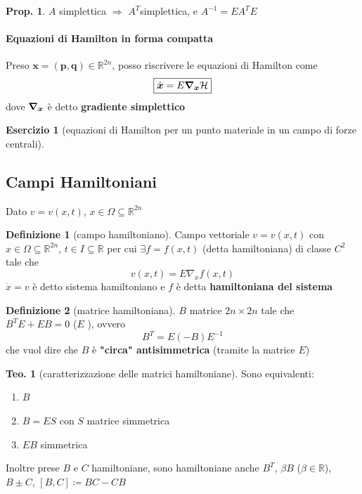 \documentclass[a4paper,10pt]{article}
\providecommand{\exercisename}{Esercizio}
\theoremstyle{definition}
\newtheorem*{xca*}{\protect\exercisename}
\newcommand{\bv}{\boldsymbol} %
\theoremstyle{indentdefinition}
\newtheorem{defn}{Definizione}[section]
\theoremstyle{indenttheorem}
\newtheorem{thm}{Teo.}
\newtheorem{prop}{Prop.}
\theoremstyle{myremark}
\theoremstyle{indentgeneral}
\begin{document}
\begin{prop}
$A$ simplettica $\Longrightarrow$ $A^{T}$simplettica, e $A^{-1}=EA^{T}E$
\end{prop}



\paragraph{Equazioni di Hamilton in forma compatta}
Preso $\bv{x}=\left(\bv{p},\bv{q}\right)\in\mathbb{R}^{2n}$,
posso riscrivere le equazioni di Hamilton come 
\[
\boxed{\dot{\bv{x}}=E\grad_{\bv{x}}\mathcal{H}}
\]
dove $\grad_{\bv{x}}$ è detto \textbf{gradiente simplettico}
\begin{xca*}[equazioni di Hamilton per un punto materiale in un campo di forze
centrali]

\end{xca*}

\subsection{Campi Hamiltoniani}

Dato $v=v\left(x,t\right)$, $x\in\Omega\subseteq\mathbb{R}^{2n}$ 
\begin{defn}[campo hamiltoniano]
\label{def:campo-hamiltoniano}Campo vettoriale $v=v\left(x,t\right)$
con $x\in\Omega\subseteq\mathbb{R}^{2n}$, $t\in I\subseteq\mathbb{R}$
per cui $\exists f=f\left(x,t\right)$ (detta hamiltoniana) di classe
$C^{2}$ tale che 
\[
v\left(x,t\right)=E\nabla_{x}f\left(x,t\right)
\]
$\dot{x}=v$ è detto sistema hamiltoniano e $f$ è detta \textbf{hamiltoniana del sistema}
\end{defn}

\begin{defn}[matrice hamiltoniana]
\label{def:matrice-hamiltoniana}$B$ matrice $2n\times2n$ tale
che $B^{T}E+EB=0$ ({\small{}$E$ }), ovvero 
$$B^{T}=E(-B)E^{-1}$$
che vuol dire che $B$ è \textbf{"circa" antisimmetrica} (tramite la matrice $E$)\\

\end{defn}

\begin{thm}[caratterizzazione delle matrici hamiltoniane]
Sono equivalenti:
\begin{enumerate}
\item $B$ 
\item $B=ES$ con $S$ matrice simmetrica
\item $EB$ simmetrica
\end{enumerate}
Inoltre prese $B$ e $C$ hamiltoniane, sono hamiltoniane anche $B^{T}$,
$\beta B$ ($\beta\in\mathbb{R}$), $B\pm C$, $\left[B,C\right]\coloneqq BC-CB$
\end{thm}
\end{document}
